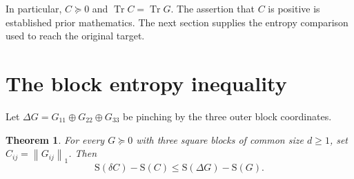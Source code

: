 \documentclass[11pt,a4paper]{article}
\newtheorem{theorem}{Theorem}
\newcommand{\tr}{\operatorname{Tr}}
\newcommand{\Ent}{\mathrm{S}}
\newcommand{\normone}[1]{\left\lVert #1\right\rVert_1}
\begin{document}
In particular, $C\succeq0$ and $\tr C=\tr G$. The assertion that $C$ is
positive is established prior mathematics. The next section supplies the
entropy comparison used to reach the original target.

\section{The block entropy inequality}

Let $\Delta G=G_{11}\oplus G_{22}\oplus G_{33}$ be pinching by the three
outer block coordinates.

\begin{theorem}\label{thm:block}
For every $G\succeq0$ with three square blocks of common size $d\ge1$, set
$C_{ij}=\normone{G_{ij}}$. Then
\begin{equation}\label{eq:block}
 \Ent(\delta C)-\Ent(C)
 \le \Ent(\Delta G)-\Ent(G).
\end{equation}
\end{theorem}
\end{document}
